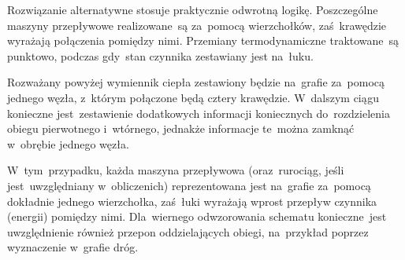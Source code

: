 Rozwiązanie alternatywne stosuje praktycznie odwrotną logikę.
Poszczególne maszyny przepływowe realizowane~są za~pomocą wierzchołków,
zaś~krawędzie wyrażają połączenia pomiędzy nimi. Przemiany
termodynamiczne traktowane~są punktowo, podczas gdy~stan czynnika
zestawiany jest na~łuku.

Rozważany powyżej wymiennik ciepła zestawiony będzie na~grafie za~pomocą
jednego węzła, z~którym połączone będą cztery krawędzie. W~dalszym ciągu
konieczne jest~zestawienie dodatkowych informacji koniecznych
do~rozdzielenia obiegu pierwotnego i~wtórnego, jednakże informacje
te~można zamknąć w~obrębie jednego węzła.

W~tym~przypadku, każda maszyna przepływowa (oraz~rurociąg, jeśli
jest~uwzględniany w~obliczenich) reprezentowana jest na~grafie za~pomocą
dokładnie jednego wierzchołka, zaś~łuki wyrażają wprost przepływ
czynnika (energii) pomiędzy nimi. Dla~wiernego odwzorowania schematu
konieczne~jest uwzględnienie również przepon oddzielających obiegi,
na~przykład poprzez wyznaczenie w~grafie dróg.
